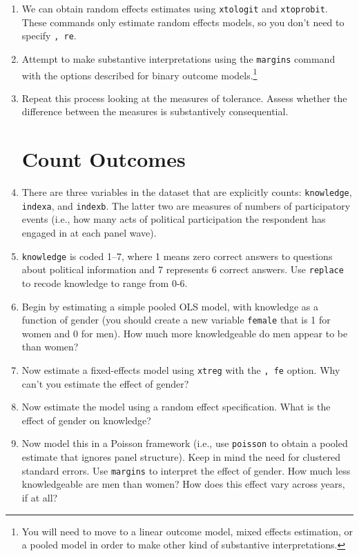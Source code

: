 \documentclass[a4paper,12pt]{article}
\begin{document}
\begin{enumerate}
\item We can obtain random effects estimates using \texttt{xtologit} and \texttt{xtoprobit}. These commands only estimate random effects models, so you don't need to specify \texttt{, re}.

\item Attempt to make substantive interpretations using the \texttt{margins} command with the options described for binary outcome models.\footnote{You will need to move to a linear outcome model, mixed effects estimation, or a pooled model in order to make other kind of substantive interpretations.}

\item Repeat this process looking at the measures of tolerance. Assess whether the difference between the measures is substantively consequential.


\section{Count Outcomes}

\item There are three variables in the dataset that are explicitly counts: \texttt{knowledge}, \texttt{indexa}, and \texttt{indexb}. The latter two are measures of numbers of participatory events (i.e., how many acts of political participation the respondent has engaged in at each panel wave).

\item \texttt{knowledge} is coded 1--7, where 1 means zero correct answers to questions about political information and 7 represents 6 correct answers. Use \texttt{replace} to recode knowledge to range from 0-6.

\item Begin by estimating a simple pooled OLS model, with knowledge as a function of gender (you should create a new variable \texttt{female} that is 1 for women and 0 for men). How much more knowledgeable do men appear to be than women?

\item Now estimate a fixed-effects model using \texttt{xtreg} with the \texttt{, fe} option. Why can't you estimate the effect of gender?

\item Now estimate the model using a random effect specification. What is the effect of gender on knowledge?

\item Now model this in a Poisson framework (i.e., use \texttt{poisson} to obtain a pooled estimate that ignores panel structure). Keep in mind the need for clustered standard errors. Use \texttt{margins} to interpret the effect of gender. How much less knowledgeable are men than women? How does this effect vary across years, if at all?


\end{enumerate}
\end{document}
